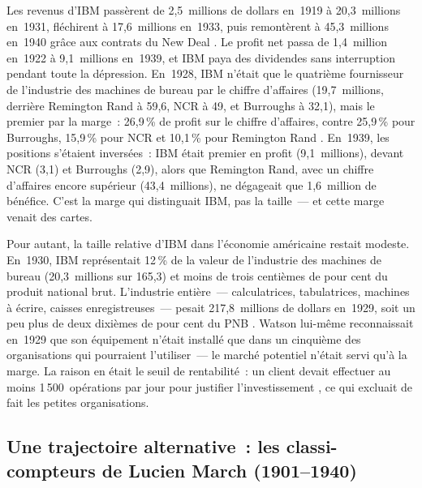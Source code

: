 %
Les revenus d'IBM passèrent de 2,5~millions de dollars en~1919 à 20,3~millions en~1931, fléchirent à 17,6~millions en~1933, puis remontèrent à 45,3~millions en~1940 grâce aux contrats du New Deal \parencite{cortada_before_1993}. Le profit net passa de 1,4~million en~1922 à 9,1~millions en~1939, et IBM paya des dividendes sans interruption pendant toute la dépression. En~1928, IBM n'était que le quatrième fournisseur de l'industrie des machines de bureau par le chiffre d'affaires (19,7~millions, derrière Remington Rand à 59,6, NCR à 49, et Burroughs à 32,1), mais le premier par la marge~: 26,9\,\% de profit sur le chiffre d'affaires, contre 25,9\,\% pour Burroughs, 15,9\,\% pour NCR et 10,1\,\% pour Remington Rand \parencite{cortada_before_1993}. En~1939, les positions s'étaient inversées~: IBM était premier en profit (9,1~millions), devant NCR (3,1) et Burroughs (2,9), alors que Remington Rand, avec un chiffre d'affaires encore supérieur (43,4~millions), ne dégageait que 1,6~million de bénéfice. C'est la marge qui distinguait IBM, pas la taille~--- et cette marge venait des cartes.

Pour autant, la taille relative d'IBM dans l'économie américaine restait modeste. En~1930, IBM représentait 12\,\% de la valeur de l'industrie des machines de bureau (20,3~millions sur 165,3) et moins de trois centièmes de pour cent du produit national brut. L'industrie entière~--- calculatrices, tabulatrices, machines à écrire, caisses enregistreuses~--- pesait 217,8~millions de dollars en~1929, soit un peu plus de deux dixièmes de pour cent du PNB \parencite{cortada_before_1993}. Watson lui-même reconnaissait en~1929 que son équipement n'était installé que dans un cinquième des organisations qui pourraient l'utiliser~--- le marché potentiel n'était servi qu'à la marge. La raison en était le seuil de rentabilité~: un client devait effectuer au moins 1\,500~opérations par jour pour justifier l'investissement \parencite{cortada_before_1993}, ce qui excluait de fait les petites organisations.


\subsection{Une trajectoire alternative~: les classi-compteurs de Lucien March (1901--1940)}\label{subsec:march_classicompteurs}

